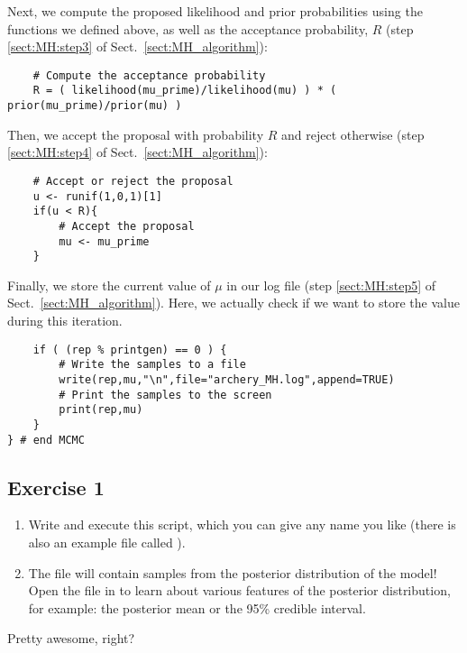 Next, we compute the proposed likelihood and prior probabilities using the functions we defined above, as well as the acceptance probability, $R$ (step \ref{sect:MH:step3} of Sect.\ \ref{sect:MH_algorithm}):
{\tt \begin{snugshade*}
\begin{lstlisting}    
    # Compute the acceptance probability
    R = ( likelihood(mu_prime)/likelihood(mu) ) * ( prior(mu_prime)/prior(mu) )
\end{lstlisting}
\end{snugshade*}}

Then, we accept the proposal with probability $R$ and reject otherwise (step \ref{sect:MH:step4} of Sect.\ \ref{sect:MH_algorithm}):
{\tt \begin{snugshade*}
\begin{lstlisting}    
    # Accept or reject the proposal
    u <- runif(1,0,1)[1]
    if(u < R){
        # Accept the proposal
        mu <- mu_prime
    }
\end{lstlisting}
\end{snugshade*}}

\pagebreak Finally, we store the current value of $\mu$ in our log file (step \ref{sect:MH:step5} of Sect.\ \ref{sect:MH_algorithm}).
Here, we actually check if we want to store the value during this iteration.
{\tt \begin{snugshade*}
\begin{lstlisting}
    if ( (rep % printgen) == 0 ) {
        # Write the samples to a file
        write(rep,mu,"\n",file="archery_MH.log",append=TRUE)
        # Print the samples to the screen
        print(rep,mu)
    }
} # end MCMC\end{lstlisting}
\end{snugshade*}}


\subsection{Exercise 1}

\begin{enumerate}[label=\textnormal{Step \arabic*)}]
	\item Write and execute this script, which you can give any name you like (there is also an example file called ).
	\item The  file will contain samples from the posterior distribution of the model! Open the file in \Tracer to learn about various features of the posterior distribution, for example: the posterior mean or the 95\% credible interval.
\end{enumerate}
Pretty awesome, right?

